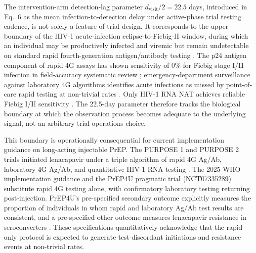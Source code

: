 \documentclass[12pt]{article}
\begin{document}
The intervention-arm detection-lag parameter $d_{\mathrm{visit}}/2 = 22.5$ days, introduced in Eq.\ 6 as the mean infection-to-detection delay under active-phase trial testing cadence, is not solely a feature of trial design. It corresponds to the upper boundary of the HIV-1 acute-infection eclipse-to-Fiebig-II window, during which an individual may be productively infected and viremic but remain undetectable on standard rapid fourth-generation antigen/antibody testing \cite{fiebig2003}. The p24 antigen component of rapid 4G assays has shown sensitivity of 0\% for Fiebig stage I/II infection in field-accuracy systematic review \cite{lewis2015}; emergency-department surveillance against laboratory 4G algorithms identifies acute infections as missed by point-of-care rapid testing at non-trivial rates \cite{white2018,stekler2016}. Only HIV-1 RNA NAT achieves reliable Fiebig I/II sensitivity \cite{branson2014}. The 22.5-day parameter therefore tracks the biological boundary at which the observation process becomes adequate to the underlying signal, not an arbitrary trial-operations choice.

This boundary is operationally consequential for current implementation guidance on long-acting injectable PrEP. The PURPOSE 1 and PURPOSE 2 trials initiated lenacapavir under a triple algorithm of rapid 4G Ag/Ab, laboratory 4G Ag/Ab, and quantitative HIV-1 RNA testing \cite{bekker2024,kelley2025}. The 2025 WHO implementation guidance \cite{who2025} and the PrEP4U pragmatic trial (NCT07335289) \cite{prep4u} substitute rapid 4G testing alone, with confirmatory laboratory testing returning post-injection. PrEP4U's pre-specified secondary outcome explicitly measures the proportion of individuals in whom rapid and laboratory Ag/Ab test results are consistent, and a pre-specified other outcome measures lenacapavir resistance in seroconverters \cite{prep4u}. These specifications quantitatively acknowledge that the rapid-only protocol is expected to generate test-discordant initiations and resistance events at non-trivial rates.
\end{document}

